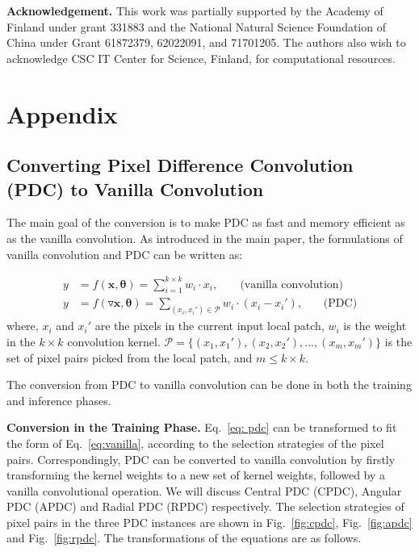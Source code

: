 \documentclass[10pt,twocolumn,letterpaper]{article}
\begin{document}
\vspace{0.5em}
\noindent \textbf{Acknowledgement.} \quad This work was partially supported by the Academy of Finland under grant 331883 and the National Natural Science Foundation of China under Grant 61872379, 62022091, and 71701205. The authors also wish to acknowledge CSC IT Center for Science, Finland, for computational resources.

{\small


}

\clearpage


\section{Appendix}

\subsection{Converting Pixel Difference Convolution (PDC) to Vanilla Convolution}

The main goal of the conversion is to make PDC as fast and memory efficient as as the vanilla convolution. 
As introduced in the main paper, the formulations of vanilla convolution and PDC can be written as:

\begin{align}
    y &= f(\pmb{x}, \pmb{\theta}) = \sum_{i=1}^{k\times k}w_{i}\cdot x_{i}, \;\;\;\;\;\;\; \text{(vanilla convolution)}\label{eq:vanilla} \\
    y &= f(\triangledown\pmb{x}, \pmb{\theta}) = \sum_{(x_i, x_i')\in \pmb{\mathcal{P}}}w_{i}\cdot (x_i - x_i'), \;\;\;\;\;\;\, \text{(PDC)} \label{eq: pdc}
\end{align}
where, $x_i$ and $x_i'$ are the pixels in the current input local patch, $w_i$ is the weight in the $k \times k$ convolution kernel. $\pmb{\mathcal{P}} = \{(x_1, x_1'), (x_2, x_2'), ..., (x_m, x_m')\}$ is the set of pixel pairs picked from the local patch, and $m\le k\times k$. 

The conversion from PDC to vanilla convolution can be done in both the training and inference phases.

\vspace{0.3em}
\noindent  \textbf{Conversion in the Training Phase.} \quad Eq.~\ref{eq: pdc} can be transformed to fit the form of Eq.~\ref{eq:vanilla}, according to the selection strategies of the pixel pairs. Correspondingly, PDC can be converted to vanilla convolution by firstly transforming the kernel weights to a new set of kernel weights, followed by a vanilla convolutional operation. We will discuss Central PDC (CPDC), Angular PDC (APDC) and Radial PDC (RPDC) respectively.
The selection strategies of pixel pairs in the three PDC instances are shown in Fig.~\ref{fig:cpdc}, Fig.~\ref{fig:apdc} and Fig.~\ref{fig:rpdc}. The transformations of the equations are as follows.
\end{document}
